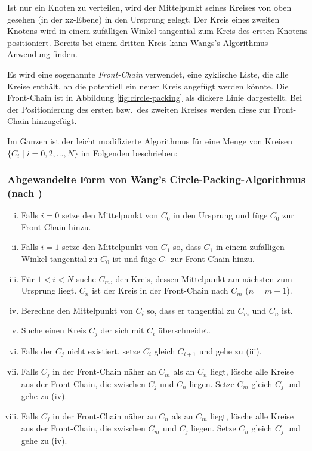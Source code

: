 Ist nur ein Knoten zu verteilen, wird der Mittelpunkt seines Kreises von oben gesehen (in der xz-Ebene) in den Ursprung gelegt. Der Kreis eines zweiten Knotens wird in einem zufälligen Winkel tangential zum Kreis des ersten Knotens positioniert. Bereits bei einem dritten Kreis kann Wangs's Algorithmus Anwendung finden.

Es wird eine sogenannte \textit{Front-Chain} verwendet, eine zyklische Liste, die alle Kreise enthält, an die potentiell ein neuer Kreis angefügt werden könnte. Die Front-Chain ist in Abbildung \ref{fig:circle-packing} als dickere Linie dargestellt. Bei der Positionierung des ersten bzw.\ des zweiten Kreises werden diese zur Front-Chain hinzugefügt.

Im Ganzen ist der leicht modifizierte Algorithmus für eine Menge von Kreisen $\lbrace C_i \mid i = 0, 2, \dots , N \rbrace$ im Folgenden beschrieben:

\subsubsection*{Abgewandelte Form von Wang's Circle-Packing-Algorithmus (nach \cite{wang2006visualization})}

\begin{enumerate}[(i), labelindent=0pt, align=left, itemsep=0pt, parsep=0pt, labelsep=.5em, leftmargin=!]
  \item Falls $i = 0$ setze den Mittelpunkt von $C_0$ in den Ursprung und füge $C_0$ zur Front-Chain hinzu.
  \item Falls $i = 1$ setze den Mittelpunkt von $C_1$ so, dass $C_1$ in einem zufälligen Winkel tangential zu $C_0$ ist und füge $C_1$ zur Front-Chain hinzu.
  \item Für $1 < i < N$ suche $C_m$, den Kreis, dessen Mittelpunkt am nächsten zum Ursprung liegt. $C_n$ ist der Kreis in der Front-Chain nach $C_m$ ($n=m+1$).
  \item Berechne den Mittelpunkt von $C_i$ so, dass er tangential zu $C_m$ und $C_n$ ist.
  \item Suche einen Kreis $C_j$ der sich mit $C_i$ überschneidet.
  \item Falls der $C_j$ nicht existiert, setze $C_i$ gleich $C_{i+1}$ und gehe zu (iii).
  \item Falls $C_j$ in der Front-Chain näher an $C_m$ als an $C_n$ liegt, lösche alle Kreise aus der Front-Chain, die zwischen $C_j$ und $C_n$ liegen. Setze $C_m$ gleich $C_j$ und gehe zu (iv).
  \item Falls $C_j$ in der Front-Chain näher an $C_n$ als an $C_m$ liegt, lösche alle Kreise aus der Front-Chain, die zwischen $C_m$ und $C_j$ liegen. Setze $C_n$ gleich $C_j$ und gehe zu (iv).
\end{enumerate}

